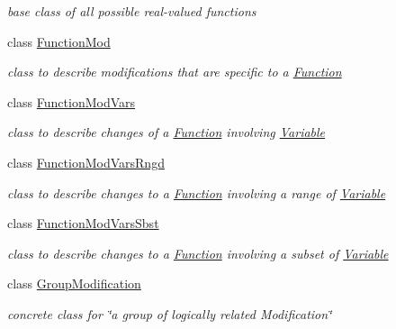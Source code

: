 \begin{DoxyCompactItemize}
\begin{DoxyCompactList}\small\item\em base class of all possible real-\/valued functions \end{DoxyCompactList}\item 
class \mbox{\hyperlink{class_s_m_spp__di__unipi__it_1_1_function_mod}{Function\+Mod}}
\begin{DoxyCompactList}\small\item\em class to describe modifications that are specific to a \mbox{\hyperlink{class_s_m_spp__di__unipi__it_1_1_function}{Function}} \end{DoxyCompactList}\item 
class \mbox{\hyperlink{class_s_m_spp__di__unipi__it_1_1_function_mod_vars}{Function\+Mod\+Vars}}
\begin{DoxyCompactList}\small\item\em class to describe changes of a \mbox{\hyperlink{class_s_m_spp__di__unipi__it_1_1_function}{Function}} involving \mbox{\hyperlink{class_s_m_spp__di__unipi__it_1_1_variable}{Variable}} \end{DoxyCompactList}\item 
class \mbox{\hyperlink{class_s_m_spp__di__unipi__it_1_1_function_mod_vars_rngd}{Function\+Mod\+Vars\+Rngd}}
\begin{DoxyCompactList}\small\item\em class to describe changes to a \mbox{\hyperlink{class_s_m_spp__di__unipi__it_1_1_function}{Function}} involving a range of \mbox{\hyperlink{class_s_m_spp__di__unipi__it_1_1_variable}{Variable}} \end{DoxyCompactList}\item 
class \mbox{\hyperlink{class_s_m_spp__di__unipi__it_1_1_function_mod_vars_sbst}{Function\+Mod\+Vars\+Sbst}}
\begin{DoxyCompactList}\small\item\em class to describe changes to a \mbox{\hyperlink{class_s_m_spp__di__unipi__it_1_1_function}{Function}} involving a subset of \mbox{\hyperlink{class_s_m_spp__di__unipi__it_1_1_variable}{Variable}} \end{DoxyCompactList}\item 
class \mbox{\hyperlink{class_s_m_spp__di__unipi__it_1_1_group_modification}{Group\+Modification}}
\begin{DoxyCompactList}\small\item\em concrete class for \char`\"{}a group of logically related Modification\char`\"{} \end{DoxyCompactList}\item 

\end{DoxyCompactItemize}
